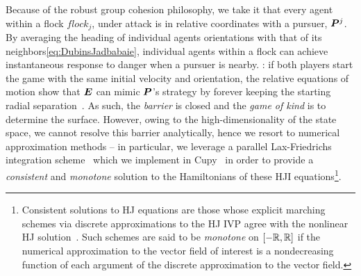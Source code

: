 Because of the robust group cohesion philosophy, we take it that every agent within a flock $flock_j$, under attack is in relative coordinates with a pursuer, $\bm{P}^j$. By averaging the heading of individual agents orientations with that of its neighbors\cf \eqref{eq:DubinsJadbabaie}, individual agents within a flock can achieve  instantaneous  response to danger when a pursuer is nearby. : if both players start the game with the same initial velocity and orientation, the relative equations of motion show that $\bm{E}$ can mimic $\bm{P}$'s strategy by forever keeping the starting radial separation~\cite{Merz1972}. As such, the \textit{barrier} is closed and the \textit{game of kind} is to determine the surface. However, owing to the high-dimensionality of the state space, we cannot resolve this barrier analytically, hence we resort to numerical approximation methods -- in particular, we leverage a parallel Lax-Friedrichs integration scheme~\cite{Crandall1984} which we implement in Cupy~\cite{CuPy} in order to provide a \textit{consistent} and \textit{monotone} solution to the Hamiltonians of these HJI equations\footnote{Consistent solutions to HJ equations are those whose explicit marching schemes via discrete  approximations to the HJ IVP agree with the nonlinear HJ solution~\cite{Crandall1984Approx}. Such schemes are said to be \textit{monotone} \eg on $\left[-\mathbb{R}, \mathbb{R}\right]$ if the numerical approximation to the vector field of interest is a nondecreasing function of each argument of the discrete approximation to the vector field.}. 
%
